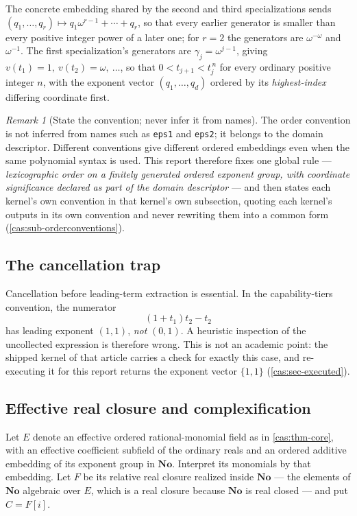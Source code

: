 \documentclass[11pt,letterpaper]{article}
\numberwithin{equation}{section}
\theoremstyle{definition}
\theoremstyle{remark}
\newtheorem{remark}[theorem]{Remark}
\newcommand{\No}{\mathbf{No}}
\begin{document}
The concrete embedding shared by the second and third specializations sends
$(q_1,\dots,q_r)\mapsto q_1\omega^{r-1}+\cdots+q_r$, so that every earlier
generator is smaller than every positive integer power of a later one; for $r=2$
the generators are $\omega^{-\omega}$ and $\omega^{-1}$. The first
specialization's generators are $\gamma_j=\omega^{j-1}$, giving
$v(t_1)=1,\ v(t_2)=\omega,\ \dots$, so that $0<t_{j+1}<t_j^{\,n}$ for every
ordinary positive integer $n$, with the exponent vector $(q_1,\dots,q_d)$
ordered by its \emph{highest-index} differing coordinate first.

\begin{remark}[State the convention; never infer it from names]
\label{cas:rem-convention}
The order convention is not inferred from names such as \texttt{eps1} and
\texttt{eps2}; it belongs to the domain descriptor. Different conventions give
different ordered embeddings even when the same polynomial syntax is used. This
report therefore fixes one global rule --- \emph{lexicographic order on a
finitely generated ordered exponent group, with coordinate significance declared
as part of the domain descriptor} --- and then states each kernel's own
convention in that kernel's own subsection, quoting each kernel's outputs in its
own convention and never rewriting them into a common form
(\cref{cas:sub-orderconventions}).
\end{remark}

\subsection{The cancellation trap}
\label{cas:sub-cancellationtrap}
Cancellation before leading-term extraction is essential. In the capability-tiers
convention, the numerator
\[
 (1+t_1)t_2-t_2
\]
has leading exponent $(1,1)$, \emph{not} $(0,1)$. A heuristic inspection of the
uncollected expression is therefore wrong. This is not an academic point: the
shipped kernel of that article carries a check for exactly this case, and
re-executing it for this report returns the exponent vector
$\{1,1\}$ (\cref{cas:sec-executed}).

\subsection{Effective real closure and complexification}
\label{cas:sub-realclosure}
Let $E$ denote an effective ordered rational-monomial field as in
\cref{cas:thm-core}, with an effective coefficient subfield of the ordinary
reals and an ordered additive embedding of its exponent group in $\No$.
Interpret its monomials by that embedding. Let $F$ be its relative real
closure realized inside $\No$ --- the elements of $\No$ algebraic over $E$,
which is a real closure because $\No$ is real closed --- and put $C=F[i]$.
\end{document}

